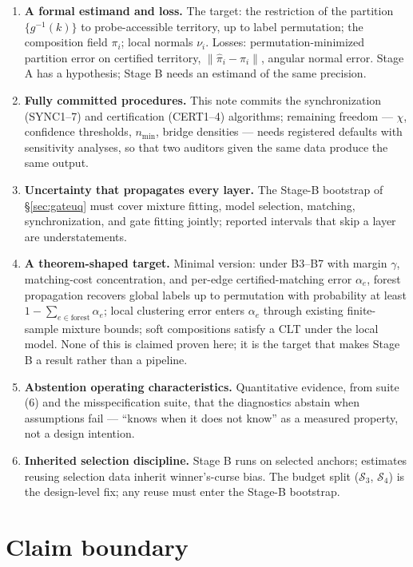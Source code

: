 \documentclass[11pt]{article}
\begin{document}
\begin{enumerate}[label=\textbf{P\arabic*.},leftmargin=2.6em]
  \item \textbf{A formal estimand and loss.} The target: the restriction of the partition
  \(\{g^{-1}(k)\}\) to probe-accessible territory, up to label permutation; the composition
  field \(\pi_i\); local normals \(\nu_i\). Losses: permutation-minimized partition error on
  certified territory, \(\|\widehat\pi_i-\pi_i\|\), angular normal error. Stage A has a
  hypothesis; Stage B needs an estimand of the same precision.
  \item \textbf{Fully committed procedures.} This note commits the synchronization
  (SYNC1--7) and certification (CERT1--4) algorithms; remaining freedom --- \(\chi\),
  confidence thresholds, \(n_{\min}\), bridge densities --- needs registered defaults with
  sensitivity analyses, so that two auditors given the same data produce the same output.
  \item \textbf{Uncertainty that propagates every layer.} The Stage-B bootstrap of
  \S\ref{sec:gateuq} must cover mixture fitting, model selection, matching,
  synchronization, and gate fitting jointly; reported intervals that skip a layer are
  understatements.
  \item \textbf{A theorem-shaped target.} Minimal version: under B3--B7 with margin
  \(\gamma\), matching-cost concentration, and per-edge certified-matching error
  \(\alpha_e\), forest propagation recovers global labels up to permutation with probability
  at least \(1-\sum_{e\in\text{forest}}\alpha_e\); local clustering error enters
  \(\alpha_e\) through existing finite-sample mixture bounds; soft compositions satisfy a
  CLT under the local model. None of this is claimed proven here; it is the target that
  makes Stage B a result rather than a pipeline.
  \item \textbf{Abstention operating characteristics.} Quantitative evidence, from suite
  (6) and the misspecification suite, that the diagnostics abstain when assumptions fail
  --- ``knows when it does not know'' as a measured property, not a design intention.
  \item \textbf{Inherited selection discipline.} Stage B runs on selected anchors;
  estimates reusing selection data inherit winner's-curse bias. The budget split
  (\(\mathcal S_3\), \(\mathcal S_4\)) is the design-level fix; any reuse must enter the
  Stage-B bootstrap.
\end{enumerate}

\section{Claim boundary}
\label{sec:boundary}
\end{document}

